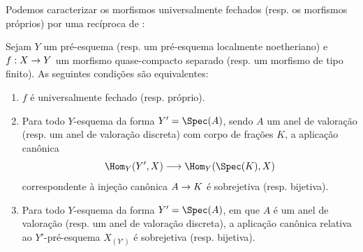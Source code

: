\documentclass[oneside,10pt]{amsart}
\makeatletter
\newcommand{\ega@arrow}[2]{\mathchoice{#1}{#2}{#2}{#2}}
\renewcommand{\to}{\ega@arrow{\longrightarrow}{\rightarrow}}
\newcommand{\oldpage}[2][]{\marginnote{\normalfont\footnotesize\textbf{#1}~|~#2}\ignorespaces}
\let\EGAOriginalLabel\label
\renewcommand{\label}[1]{\phantomsection\EGAOriginalLabel{#1}}
\makeatother
\begin{document}
Podemos caracterizar os morfismos universalmente fechados (resp. os morfismos próprios) por uma recíproca de :
\begin{theorem}[7.3.8]
\label{II.7.3.8}
Sejam $Y$ um pré-esquema (resp. um pré-esquema localmente noetheriano) e $f:X\to Y$ um morfismo quase-compacto separado (resp. um morfismo de tipo finito).
As seguintes condições são equivalentes:
\begin{enumerate}
    \item[\rm{(a)}] $f$ é universalmente fechado (resp. próprio).
    \item[\rm{(b)}] Para todo $Y$-esquema da forma $Y'=\Spec(A)$, sendo $A$ um anel de valoração (resp. um anel de valoração discreta) com corpo de frações $K$, a aplicação canônica
        \[
            \Hom_Y(Y',X) \to \Hom_Y(\Spec(K),X)
        \]
        correspondente à injeção canônica $A\to K$ é sobrejetiva (resp. bijetiva).
\oldpage[II]{145}
  \item[\rm{(c)}] Para todo $Y$-esquema da forma $Y'=\Spec(A)$, em que $A$ é um anel de valoração (resp. um anel de valoração discreta), a aplicação canônica  relativa ao $Y'$-pré-esquema $X_{(Y')}$ é sobrejetiva (resp. bijetiva).
\end{enumerate}
\end{theorem}
\end{document}
